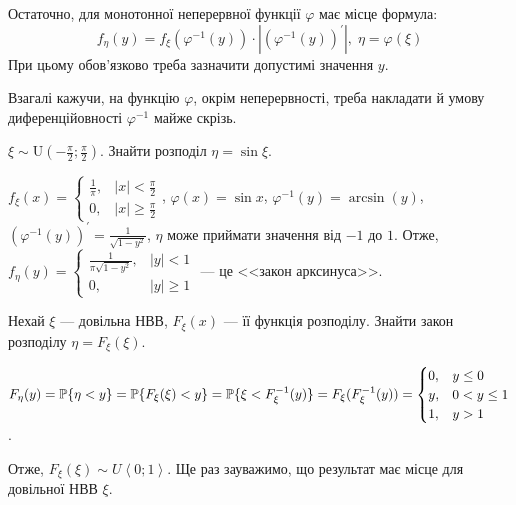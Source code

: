 \noindent Остаточно, для монотонної неперервної функції $\varphi$ має місце формула:
$$f_\eta(y) = f_\xi\left(\varphi^{-1} (y)\right) \cdot \left|\left(\varphi^{-1} (y) \right)^{\prime}\right|, \; \eta = \varphi(\xi)$$
При цьому обов'язково треба зазначити допустимі значення $y$.

\begin{remark}
    Взагалі кажучи, на функцію $\varphi$, окрім неперервності, треба накладати й умову диференційовності $\varphi^{-1}$ майже скрізь. 
\end{remark}

\begin{example}
    $\xi \sim \mathrm{U}(-\frac{\pi}{2}; \frac{\pi}{2})$. Знайти розподіл $\eta = \sin \xi$.

    \noindent $f_\xi(x) = \begin{cases}
        \frac{1}{\pi}, & |x| < \frac{\pi}{2} \\
        0, & |x| \geq \frac{\pi}{2}
    \end{cases}$, $\varphi(x) = \sin x$, $\varphi^{-1} (y) = \arcsin(y)$, $\left(\varphi^{-1} (y)\right)^{\prime} = \frac{1}{\sqrt{1-y^2}}$,
    $\eta$ може приймати значення від $-1$ до $1$. 
    Отже, $f_\eta(y) = \begin{cases}
        \frac{1}{\pi\sqrt{1-y^2}}, & |y| < 1 \\
        0, & |y| \geq 1
    \end{cases}$ --- це <<закон арксинуса>>.
\end{example}

\begin{example}
    Нехай $\xi$ --- довільна НВВ, $F_\xi (x)$ --- її функція розподілу. 
    Знайти закон розподілу $\eta = F_\xi (\xi)$.

    \noindent $F_\eta (y) = \P\{\eta < y\} = \P\{F_\xi(\xi) < y\} = \P\{\xi < F_\xi^{-1}(y)\} = F_\xi(F_\xi^{-1}(y)) = \begin{cases}
        0, & y \leq 0 \\
        y, & 0 < y \leq 1 \\
        1, & y > 1
    \end{cases}$.

    \noindent Отже, $F_\xi (\xi) \sim U\left<0;1\right>$. Ще раз зауважимо, що результат має місце для довільної НВВ $\xi$.
\end{example}

